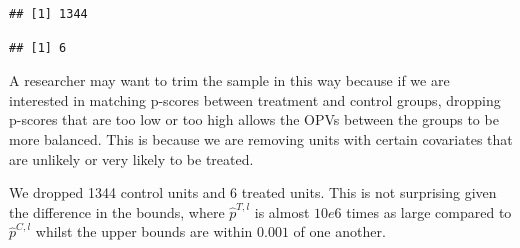 \documentclass[
]{article}
\newenvironment{Shaded}{\begin{snugshade}}{\end{snugshade}}
\newcommand{\DecValTok}[1]{\textcolor[rgb]{0.00,0.00,0.81}{#1}}
\newcommand{\FunctionTok}[1]{\textcolor[rgb]{0.13,0.29,0.53}{\textbf{#1}}}
\newcommand{\NormalTok}[1]{#1}
\newcommand{\SpecialCharTok}[1]{\textcolor[rgb]{0.81,0.36,0.00}{\textbf{#1}}}
\begin{document}
\begin{verbatim}
## [1] 1344
\end{verbatim}

\begin{Shaded}
\end{Shaded}

\begin{verbatim}
## [1] 6
\end{verbatim}

A researcher may want to trim the sample in this way because if we are
interested in matching p-scores between treatment and control groups,
dropping p-scores that are too low or too high allows the OPVs between
the groups to be more balanced. This is because we are removing units
with certain covariates that are unlikely or very likely to be treated.

We dropped 1344 control units and 6 treated units. This is not
surprising given the difference in the bounds, where \(\hat{p}^{T,l}\)
is almost \(10e6\) times as large compared to \(\hat{p}^{C,l}\) whilst
the upper bounds are within \(0.001\) of one another.
\end{document}
